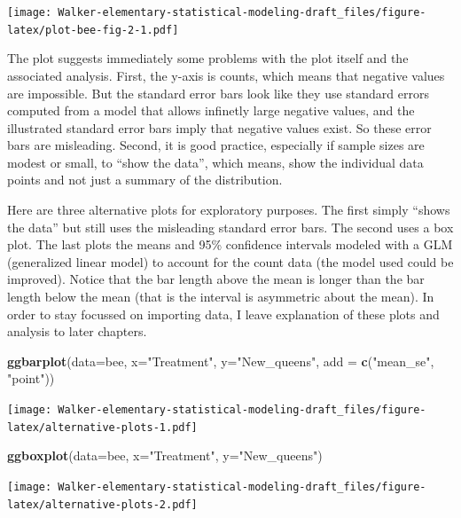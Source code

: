 \documentclass[]{book}
\newenvironment{Shaded}{\begin{snugshade}}{\end{snugshade}}
\newcommand{\KeywordTok}[1]{\textcolor[rgb]{0.13,0.29,0.53}{\textbf{#1}}}
\newcommand{\DataTypeTok}[1]{\textcolor[rgb]{0.13,0.29,0.53}{#1}}
\newcommand{\StringTok}[1]{\textcolor[rgb]{0.31,0.60,0.02}{#1}}
\newcommand{\NormalTok}[1]{#1}
\begin{document}
\texttt{[image: Walker-elementary-statistical-modeling-draft\_files/figure-latex/plot-bee-fig-2-1.pdf]}

The plot suggests immediately some problems with the plot itself and the
associated analysis. First, the y-axis is counts, which means that
negative values are impossible. But the standard error bars look like
they use standard errors computed from a model that allows infinetly
large negative values, and the illustrated standard error bars imply
that negative values exist. So these error bars are misleading. Second,
it is good practice, especially if sample sizes are modest or small, to
``show the data'', which means, show the individual data points and not
just a summary of the distribution.

Here are three alternative plots for exploratory purposes. The first
simply ``shows the data'' but still uses the misleading standard error
bars. The second uses a box plot. The last plots the means and 95\%
confidence intervals modeled with a GLM (generalized linear model) to
account for the count data (the model used could be improved). Notice
that the bar length above the mean is longer than the bar length below
the mean (that is the interval is asymmetric about the mean). In order
to stay focussed on importing data, I leave explanation of these plots
and analysis to later chapters.

\begin{Shaded}
\begin{Highlighting}[]
\KeywordTok{ggbarplot}\NormalTok{(}\DataTypeTok{data=}\NormalTok{bee, }\DataTypeTok{x=}\StringTok{"Treatment"}\NormalTok{, }\DataTypeTok{y=}\StringTok{"New_queens"}\NormalTok{, }\DataTypeTok{add =} \KeywordTok{c}\NormalTok{(}\StringTok{"mean_se"}\NormalTok{, }\StringTok{"point"}\NormalTok{))}
\end{Highlighting}
\end{Shaded}

\texttt{[image: Walker-elementary-statistical-modeling-draft\_files/figure-latex/alternative-plots-1.pdf]}

\begin{Shaded}
\begin{Highlighting}[]
\KeywordTok{ggboxplot}\NormalTok{(}\DataTypeTok{data=}\NormalTok{bee, }\DataTypeTok{x=}\StringTok{"Treatment"}\NormalTok{, }\DataTypeTok{y=}\StringTok{"New_queens"}\NormalTok{)}
\end{Highlighting}
\end{Shaded}

\texttt{[image: Walker-elementary-statistical-modeling-draft\_files/figure-latex/alternative-plots-2.pdf]}
\end{document}
